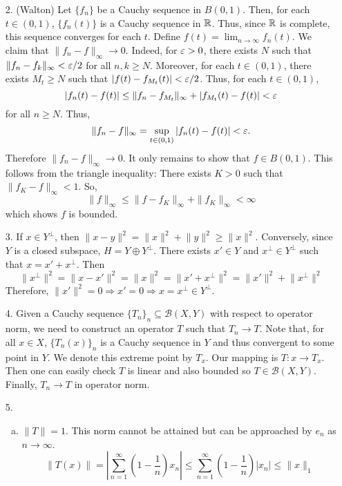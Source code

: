 \begin{itemize}
		\item[2.] (Walton) %
		Let $\{f_n\}$ be a Cauchy sequence in $B(0,1)$. Then, for each $t \in (0,1)$, $\{f_n(t)\}$ is a Cauchy sequence in $\mathbb{R}$. Thus, since $\mathbb{R}$ is complete, this sequence converges for each $t$. Define $f(t) = \lim_{n \to \infty} f_n(t)$. We claim that $\|f_n-f\|_\infty \to 0$. Indeed, for $\varepsilon >0$, there exists $N$ such that $\|f_n-f_k\|_\infty < \varepsilon /2$ for all $n,k \ge N$. Moreover, for each $t \in 
(0,1)$, there exists $M_t \ge N$ such that $|f(t)-f_{M_t}(t)| < \varepsilon/2$. Thus, for each $t \in (0,1)$,
			\[ |f_n(t)-f(t)| \le \|f_n-f_{M_t}\|_\infty + |f_{M_t}(t)-f(t)| < \varepsilon \]
		for all $n \ge N$. Thus,
			\[ \|f_n-f\|_\infty = \sup_{t \in (0,1)} |f_n(t)-f(t)| < \varepsilon. \]
		Therefore $\|f_n-f\|_\infty \to 0$. It only remains to show that $f \in B(0,1)$. This follows from the triangle inequality: There exists $K>0$ such that $\|f_K-f\|_\infty < 1$. So,
			\[ \|f\|_\infty \le \|f-f_K\|_\infty + \|f_K\|_\infty < \infty \]
		which shows $f$ is bounded.
		\item[3.] If $x\in Y^\perp$, then $\lVert x-y\rVert^2 = \lVert x\rVert^2 +  \lVert y\rVert^2 \ge \lVert x\rVert^2$. Conversely, since $Y$ is a closed subspace, $H= Y\oplus Y^\perp$. There exists $x' \in Y$ and $x^\perp \in Y^\perp$ such that $x = x'+x^\perp$. Then 
		$$
		\lVert x^\perp \rVert^2=\lVert x - x'\rVert^2 = \lVert x\rVert^2 = \lVert  x'+x^\perp\rVert^2 =  \lVert x'\rVert^2+\lVert x^\perp\rVert^2
		$$
		Therefore, $\lVert x'\rVert^2 = 0 \Rightarrow x' = 0 \Rightarrow x= x^\perp \in Y^\perp$.
		
		\item[4.]  Given a Cauchy sequence $\{T_n\}_n\subseteq \mathcal{B}(X,Y)$ with respect to operator norm, we need to construct an operator $T$ such that $T_n\rightarrow T$. Note that, for all $x\in X$, $\{T_n(x)\}_n$ is a Cauchy sequence in $Y$ and thus convergent to some point in $Y$. We denote this extreme point by $T_x$. Our mapping is $T: x\rightarrow T_x$. Then one can easily check $T$ is linear and also bounded so $T\in \mathcal{B}(X,Y)$. Finally, $T_n\rightarrow T$ in operator norm. 
		
		\item[5.] \begin{enumerate}[(a)]
			\item $\lVert T\rVert  =1$. This norm cannot be attained but can be approached by $e_n$ as $n\rightarrow \infty$.
			$$
			\left\lVert T(x) \right\rVert = \left\lvert \sum_{n=1}^\infty \left(1-\frac{1}{n}\right)x_n  \right\rvert \le  \sum_{n=1}^\infty \left(1-\frac{1}{n}\right) \left\lvert  x_n  \right\rvert  \le \lVert x\rVert_1
			$$
			

\end{enumerate}
\end{itemize}
